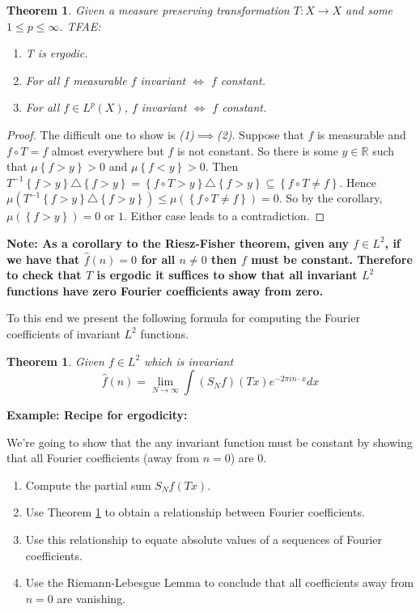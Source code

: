 \documentclass[11pt]{article}
\newcommand{\symd}{\triangle}
\newcommand{\R}{\mathbb{R}}
\newenvironment{note}
	{\begin{mdframed}[backgroundcolor=white, linecolor=RubineRed, roundcorner=5pt, linewidth=1pt]\bfseries{Note:}\normalfont}
	{\end{mdframed}}
\newenvironment{eg}
	{\begin{mdframed}[backgroundcolor=mylg,roundcorner=5pt,linewidth=0pt]\bfseries{Example:}\normalfont}
	{\end{mdframed}}
\newtheorem{theorem}[prop]{Theorem}
\begin{document}
\begin{theorem}
Given a measure preserving transformation $T:X\to X$ and some $1\leq p\leq\infty$. TFAE:
\begin{enumerate}
	\item T is ergodic.
	\item For all $f$ measurable $f$ invariant $\iff$ $f$ constant.
	\item For all $f\in L^p(X)$, $f$ invariant $\iff$ $f$ constant.
\end{enumerate}
\end{theorem}

\begin{proof}
The difficult one to show is \textit{(1)}$\implies$\textit{(2)}.
Suppose that $f$ is measurable and $f\circ T = f$ almost everywhere but $f$ is not constant.
So there is some $y\in \R$ such that $\mu\left\{ f > y\right\}>0$ and $\mu\left\{ f < y\right\}>0$.
Then $T^{-1}\left\{ f > y \right\}\symd \left\{ f > y\right\} = \left\{ f \circ T > y\right\} \symd \left\{ f > y \right\} \subseteq \left\{ f\circ T \neq f\right\}$.
Hence $\mu(T^{-1}\left\{ f > y\right\} \symd \left\{ f>y\right\}) \leq \mu(\left\{ f \circ T \neq f\right\}) = 0$.
So by the corollary, $\mu(\left\{ f > y\right\}) = 0$ or $1$.
Either case leads to a contradiction.
\end{proof}

\begin{note}
	As a corollary to the Riesz-Fisher theorem, given any $f\in L^2$, if we have that $\hat{f}(n)=0$ for all $n\neq 0$ then $f$ must be constant.
Therefore to check that $T$ is ergodic it suffices to show that all invariant $L^2$ functions have zero Fourier coefficients away from zero.
\end{note}
To this end we present the following formula for computing the Fourier coefficients of invariant $L^2$ functions.
\begin{theorem}
\label{th:coeffcompute}
Given $f\in L^2$ which is invariant
$$\hat{f}(n)=\lim_{N\to\infty}\int (S_Nf)(Tx)e^{-2\pi i n\cdot x}dx$$
\end{theorem}

\begin{eg}
	\textbf{Recipe for ergodicity:}

	We're going to show that the any invariant function must be constant by showing that all Fourier coefficients (away from $n=0$) are $0$.

	\begin{enumerate}
		\item Compute the partial sum $S_Nf(Tx)$.
		\item Use Theorem \ref{th:coeffcompute} to obtain a relationship between Fourier coefficients.
		\item Use this relationship to equate absolute values of a sequences of Fourier coefficients.
		\item Use the Riemann-Lebesgue Lemma to conclude that all coefficients away from $n=0$ are vanishing.
	\end{enumerate}
\end{eg}
\end{document}
